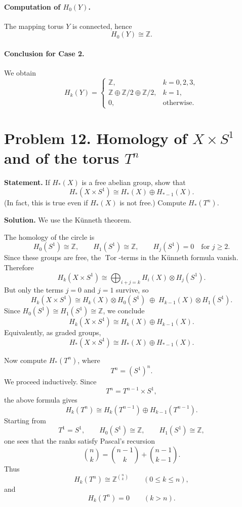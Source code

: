 \documentclass[12pt,a4paper]{article}
\theoremstyle{notespace}
\begin{document}
\paragraph{Computation of \(H_0(Y)\).}
The mapping torus \(Y\) is connected, hence
\[
H_0(Y)\cong \mathbb Z.
\]

\paragraph{Conclusion for Case 2.}
We obtain
\[
H_k(Y)=
\begin{cases}
	\mathbb Z, & k=0,2,3,\\
	\mathbb Z\oplus \mathbb Z/2\oplus \mathbb Z/2, & k=1,\\
	0, & \text{otherwise}.
\end{cases}
\]



\section{Problem 12. Homology of \(X\times S^1\) and of the torus \(T^n\)}

\textbf{Statement.}
If \(H_*(X)\) is a free abelian group, show that
\[
H_*(X\times S^1)\cong H_*(X)\oplus H_{*-1}(X).
\]
(In fact, this is true even if \(H_*(X)\) is not free.) Compute \(H_*(T^n)\).

\medskip

\textbf{Solution.}
We use the K\"unneth theorem.

The homology of the circle is
\[
H_0(S^1)\cong \mathbb Z,\qquad
H_1(S^1)\cong \mathbb Z,\qquad
H_j(S^1)=0 \quad \text{for }j\ge 2.
\]
Since these groups are free, the \(\operatorname{Tor}\)-terms in the K\"unneth formula vanish. Therefore
\[
H_k(X\times S^1)\cong \bigoplus_{i+j=k} H_i(X)\otimes H_j(S^1).
\]
But only the terms \(j=0\) and \(j=1\) survive, so
\[
H_k(X\times S^1)\cong H_k(X)\otimes H_0(S^1)\;\oplus\; H_{k-1}(X)\otimes H_1(S^1).
\]
Since \(H_0(S^1)\cong H_1(S^1)\cong \mathbb Z\), we conclude
\[
H_k(X\times S^1)\cong H_k(X)\oplus H_{k-1}(X).
\]
Equivalently, as graded groups,
\[
H_*(X\times S^1)\cong H_*(X)\oplus H_{*-1}(X).
\]

\medskip

Now compute \(H_*(T^n)\), where
\[
T^n=(S^1)^n.
\]
We proceed inductively. Since
\[
T^n=T^{n-1}\times S^1,
\]
the above formula gives
\[
H_k(T^n)\cong H_k(T^{n-1})\oplus H_{k-1}(T^{n-1}).
\]
Starting from
\[
T^1=S^1,\qquad H_0(S^1)\cong \mathbb Z,\qquad H_1(S^1)\cong \mathbb Z,
\]
one sees that the ranks satisfy Pascal's recursion
\[
\binom{n}{k}=\binom{n-1}{k}+\binom{n-1}{k-1}.
\]
Thus
\[
H_k(T^n)\cong \mathbb Z^{\binom{n}{k}}
\qquad (0\le k\le n),
\]
and
\[
H_k(T^n)=0\qquad (k>n).
\]
\end{document}
